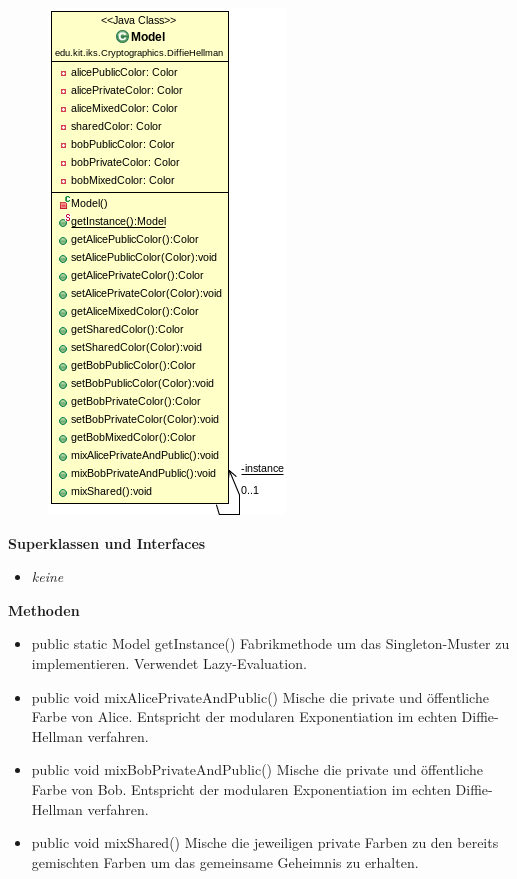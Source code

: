 \documentclass{article}
\begin{document}
      \begin{figure}[H]
        \centering
        \includegraphics{resources/edu-kit-iks-Cryptographics-DiffieHellman-Model}
      \end{figure}

      \textbf{Superklassen und Interfaces}
      \begin{itemize}
        \item \textit{keine}
      \end{itemize}

      \textbf{Methoden}
      \begin{itemize}
        \item public static Model getInstance() \newline
            Fabrikmethode um das Singleton-Muster zu implementieren.
            Verwendet Lazy-Evaluation.
        \item public void mixAlicePrivateAndPublic() \newline
            Mische die private und öffentliche Farbe
            von Alice. Entspricht der modularen Exponentiation
            im echten Diffie-Hellman verfahren.
        \item public void mixBobPrivateAndPublic() \newline
            Mische die private und öffentliche Farbe
            von Bob. Entspricht der modularen Exponentiation
            im echten Diffie-Hellman verfahren.
        \item public void mixShared() \newline
            Mische die jeweiligen private Farben
            zu den bereits gemischten Farben
            um das gemeinsame Geheimnis zu erhalten.
      \end{itemize}
\end{document}
